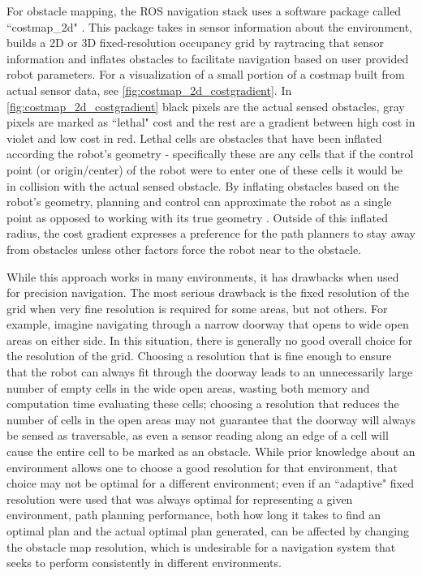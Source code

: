 For obstacle mapping, the ROS navigation stack uses a software package called ``costmap\_2d" \autocite{Costmap2DWiki}. This package takes in sensor information about the environment, builds a 2D or 3D fixed-resolution occupancy grid by raytracing that sensor information and inflates obstacles to facilitate navigation based on user provided robot parameters. For a visualization of a small portion of a costmap built from actual sensor data, see \autoref{fig:costmap_2d_costgradient}. In \autoref{fig:costmap_2d_costgradient} black pixels are the actual sensed obstacles, gray pixels are marked as ``lethal" cost and the rest are a gradient between high cost in violet and low cost in red. Lethal cells are obstacles that have been inflated according the robot's geometry - specifically these are any cells that if the control point (or origin/center) of the robot were to enter one of these cells it would be in collision with the actual sensed obstacle. By inflating obstacles based on the robot's geometry, planning and control can approximate the robot as a single point as opposed to working with its true geometry \autocite{siegwart2004introduction}. Outside of this inflated radius, the cost gradient expresses a preference for the path planners to stay away from obstacles unless other factors force the robot near to the obstacle.

While this approach works in many environments, it has drawbacks when used for precision navigation. The most serious drawback is the fixed resolution of the grid when very fine resolution is required for some areas, but not others. For example, imagine navigating through a narrow doorway that opens to wide open areas on either side. In this situation, there is generally no good overall choice for the resolution of the grid. Choosing a resolution that is fine enough to ensure that the robot can always fit through the doorway leads to an unnecessarily large number of empty cells in the wide open areas, wasting both memory and computation time evaluating these cells; choosing a resolution that reduces the number of cells in the open areas may not guarantee that the doorway will always be sensed as traversable, as even a sensor reading along an edge of a cell will cause the entire cell to be marked as an obstacle. While prior knowledge about an environment allows one to choose a good resolution for that environment, that choice may not be optimal for a different environment; even if an ``adaptive" fixed resolution were used that was always optimal for representing a given environment, path planning performance, both how long it takes to find an optimal plan and the actual optimal plan generated, can be affected by changing the obstacle map resolution, which is undesirable for a navigation system that seeks to perform consistently in different environments.

